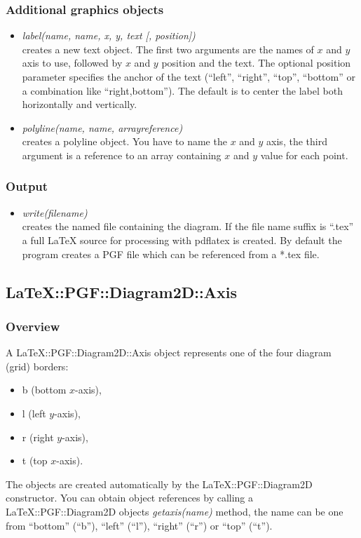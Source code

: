 \documentclass[origlongtable]{scrartcl}
\begin{document}
\subsubsection{Additional graphics objects}
\begin{itemize}
\item	\textit{label(name, name, x, y, text [, position])\/}\\
creates a new text object. The first two arguments are the names of
\(x\) and \(y\) axis to use, followed by \(x\) and \(y\) position
and the text. The optional position parameter specifies the anchor
of the text (``left'', ``right'', ``top'', ``bottom'' or a combination
like ``right,bottom''). The default is to center the label both
horizontally and vertically.
\item	\textit{polyline(name, name, arrayreference)\/}\\
creates a polyline object. You have to name the \(x\) and \(y\) axis,
the third argument is a reference to an array containing \(x\) and
\(y\) value for each point.
\end{itemize}
\subsubsection{Output}
\begin{itemize}
\item	\textit{write(filename)\/}\\
creates the named file containing the diagram. If the file name
suffix is ``.tex'' a full \LaTeX{} source for processing with pdflatex
is created.
By default the program creates a PGF file which can be referenced
from a *.tex file.
\end{itemize}
\clearpage
\subsection[Axis]{LaTeX::PGF::Diagram2D::Axis}
\subsubsection{Overview}
A LaTeX::PGF::Diagram2D::Axis object represents one of the four diagram
(grid) borders:
\begin{itemize}
\item	b (bottom \(x\)-axis),
\item	l (left \(y\)-axis),
\item	r (right \(y\)-axis),
\item	t (top \(x\)-axis).
\end{itemize}
The objects are created automatically by the LaTeX::PGF::Diagram2D
constructor. You can obtain object references by calling a
LaTeX::PGF::Diagram2D objects \textit{get\textunderscore{}axis(name)\/}
method, the name can be one from ``bottom'' (``b''), ``left'' (``l''),
``right'' (``r'') or ``top'' (``t'').
\end{document}
